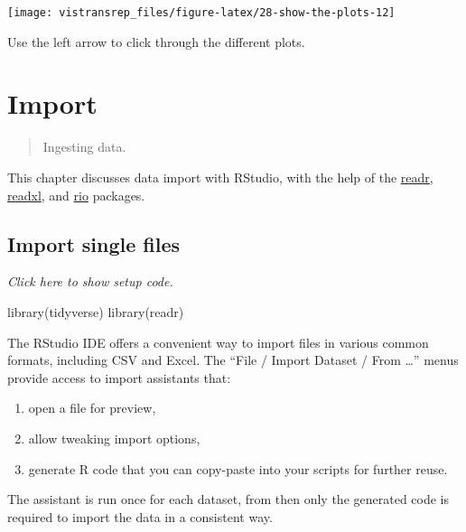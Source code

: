 \documentclass[]{book}
\newenvironment{Shaded}{}{}
\newcommand{\KeywordTok}[1]{\textcolor[rgb]{0.00,0.00,1.00}{#1}}
\newcommand{\NormalTok}[1]{#1}
\providecommand{\tightlist}{%
  \setlength{\itemsep}{0pt}\setlength{\parskip}{0pt}}
\begin{document}
\begin{flushright}\texttt{[image: vistransrep\_files/figure-latex/28-show-the-plots-12]} \end{flushright}

Use the left arrow to click through the different plots.

\hypertarget{import}{%
\chapter{Import}\label{import}}

\begin{quote}
Ingesting data.
\end{quote}

This chapter discusses data import with RStudio, with the help of the \href{https://readr.tidyverse.org/}{readr}, \href{https://readxl.tidyverse.org/}{readxl}, and \href{https://github.com/leeper/rio}{rio} packages.

\hypertarget{import-single-files}{%
\section{Import single files}\label{import-single-files}}

\emph{Click here to show setup code.}

\begin{Shaded}
\begin{Highlighting}[]
\KeywordTok{library}\NormalTok{(tidyverse)}
\KeywordTok{library}\NormalTok{(readr)}
\end{Highlighting}
\end{Shaded}

The RStudio IDE offers a convenient way to import files in various common formats, including CSV and Excel.
The ``File / Import Dataset / From \ldots{}'' menus provide access to import assistants that:

\begin{enumerate}
\def\labelenumi{\arabic{enumi}.}
\tightlist
\item
  open a file for preview,
\item
  allow tweaking import options,
\item
  generate R code that you can copy-paste into your scripts for further reuse.
\end{enumerate}

The assistant is run once for each dataset, from then only the generated code is required to import the data in a consistent way.
\end{document}
